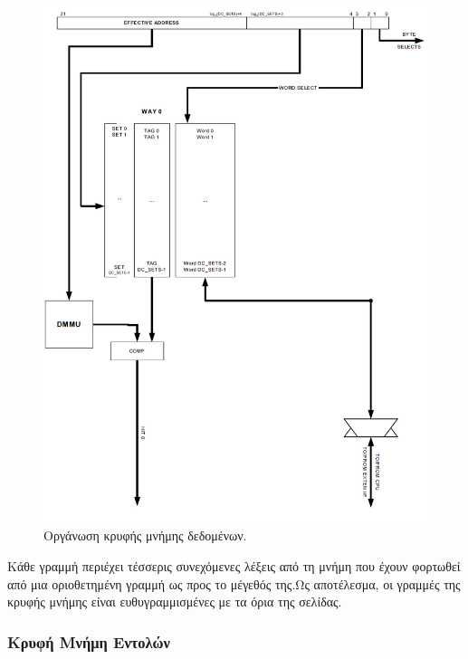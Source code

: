 \documentclass[a4paper,10pt]{article}
\numberwithin{figure}{subsection}
\numberwithin{table}{subsection}
\begin{document}
{\vspace{0.7cm}
\begin{figure}[h!]
 \centering
 \includegraphics[bb=0 0 906 1228,scale=0.38]{./Images/data_cache.png}
 \caption{Οργάνωση κρυφής μνήμης δεδομένων.}
\end{figure}
\vspace{0.7cm}

Κάθε γραμμή περιέχει τέσσερις συνεχόμενες λέξεις από τη μνήμη που έχουν φορτωθεί από μια 
οριοθετημένη γραμμή ως προς το μέγεθός της.Ως αποτέλεσμα, οι γραμμές της κρυφής μνήμης 
είναι ευθυγραμμισμένες με τα όρια της σελίδας.

\subsubsection{Κρυφή Μνήμη Εντολών}


}
\end{document}
